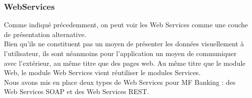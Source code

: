 \subsubsection*{WebServices} 

Comme indiqué précedemment, on peut voir les Web Services comme une couche de présentation alternative.\\
Bien qu'ils ne constituent pas un moyen de présenter les données visuellement à l'utilisateur, ils sont néanmoins pour l'application un moyen de communiquer avec l'extérieur, au même titre que des pages web. Au même titre que le module Web, le module Web Services vient réutiliser le modules Services.\\

Nous avons mis en place deux types de Web Services pour MF Banking : des Web Services SOAP et des Web Services REST.\\


